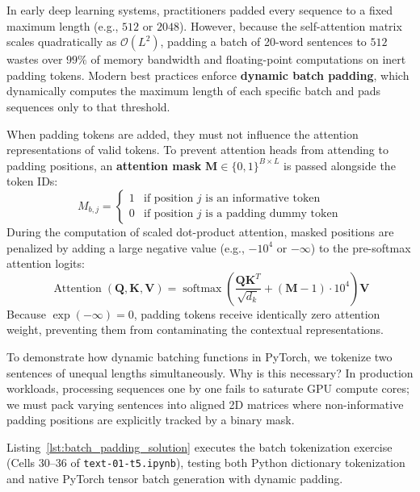\documentclass[11pt,a4paper]{article}
\begin{document}
In early deep learning systems, practitioners padded every sequence to a fixed maximum length (e.g., $512$ or $2048$). However, because the self-attention matrix scales quadratically as $\mathcal{O}(L^2)$, padding a batch of 20-word sentences to $512$ wastes over $99\%$ of memory bandwidth and floating-point computations on inert padding tokens. Modern best practices enforce \textbf{dynamic batch padding}, which dynamically computes the maximum length of each specific batch and pads sequences only to that threshold.

When padding tokens are added, they must not influence the attention representations of valid tokens. To prevent attention heads from attending to padding positions, an \textbf{attention mask} $\mathbf{M} \in \{0, 1\}^{B \times L}$ is passed alongside the token IDs:
\begin{equation}
M_{b, j} = \begin{cases} 1 & \text{if position } j \text{ is an informative token} \\ 0 & \text{if position } j \text{ is a padding dummy token} \end{cases}
\end{equation}
During the computation of scaled dot-product attention, masked positions are penalized by adding a large negative value (e.g., $-10^4$ or $-\infty$) to the pre-softmax attention logits:
\begin{equation}
\operatorname{Attention}(\mathbf{Q}, \mathbf{K}, \mathbf{V}) = \operatorname{softmax}\left(\frac{\mathbf{Q}\mathbf{K}^T}{\sqrt{d_k}} + (\mathbf{M} - 1) \cdot 10^4\right)\mathbf{V}
\end{equation}
Because $\exp(-\infty) = 0$, padding tokens receive identically zero attention weight, preventing them from contaminating the contextual representations.

To demonstrate how dynamic batching functions in PyTorch, we tokenize two sentences of unequal lengths simultaneously. Why is this necessary? In production workloads, processing sequences one by one fails to saturate GPU compute cores; we must pack varying sentences into aligned 2D matrices where non-informative padding positions are explicitly tracked by a binary mask.

Listing~\ref{lst:batch_padding_solution} executes the batch tokenization exercise (Cells 30--36 of \texttt{text-01-t5.ipynb}), testing both Python dictionary tokenization and native PyTorch tensor batch generation with dynamic padding.
\end{document}
